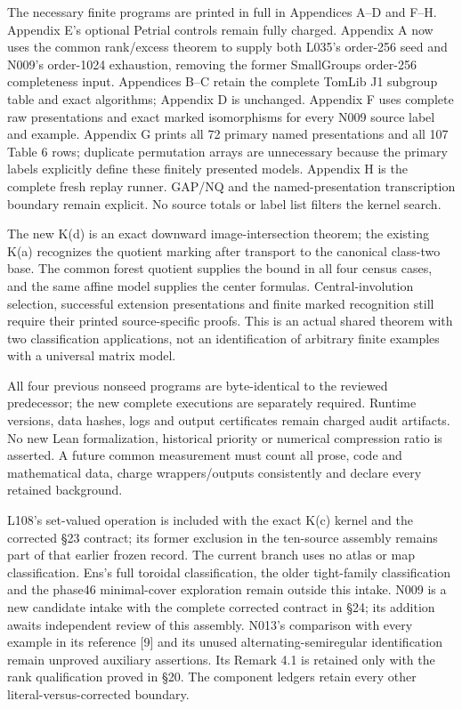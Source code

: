\documentclass[
  10pt,
  letterpaper,
]{article}
\begin{document}
The necessary finite programs are printed in full in Appendices A--D and
F--H. Appendix E's optional Petrial controls remain fully charged.
Appendix A now uses the common rank/excess theorem to supply both L035's
order-256 seed and N009's order-1024 exhaustion, removing the former
SmallGroups order-256 completeness input. Appendices B--C retain the
complete TomLib J1 subgroup table and exact algorithms; Appendix D is
unchanged. Appendix F uses complete raw presentations and exact marked
isomorphisms for every N009 source label and example. Appendix G prints
all 72 primary named presentations and all 107 Table 6 rows; duplicate
permutation arrays are unnecessary because the primary labels explicitly
define these finitely presented models. Appendix H is the complete fresh
replay runner. GAP/NQ and the named-presentation transcription boundary
remain explicit. No source totals or label list filters the kernel
search.

The new K(d) is an exact downward image-intersection theorem; the
existing K(a) recognizes the quotient marking after transport to the
canonical class-two base. The common forest quotient supplies the bound
in all four census cases, and the same affine model supplies the center
formulas. Central-involution selection, successful extension
presentations and finite marked recognition still require their printed
source-specific proofs. This is an actual shared theorem with two
classification applications, not an identification of arbitrary finite
examples with a universal matrix model.

All four previous nonseed programs are byte-identical to the reviewed
predecessor; the new complete executions are separately required.
Runtime versions, data hashes, logs and output certificates remain
charged audit artifacts. No new Lean formalization, historical priority
or numerical compression ratio is asserted. A future common measurement
must count all prose, code and mathematical data, charge
wrappers/outputs consistently and declare every retained background.

L108's set-valued operation is included with the exact K(c) kernel and
the corrected §23 contract; its former exclusion in the ten-source
assembly remains part of that earlier frozen record. The current branch
uses no atlas or map classification. Ens's full toroidal classification,
the older tight-family classification and the phase46 minimal-cover
exploration remain outside this intake. N009 is a new candidate intake
with the complete corrected contract in §24; its addition awaits
independent review of this assembly. N013's comparison with every
example in its reference {[}9{]} and its unused alternating-semiregular
identification remain unproved auxiliary assertions. Its Remark 4.1 is
retained only with the rank qualification proved in §20. The component
ledgers retain every other literal-versus-corrected boundary.
\end{document}

